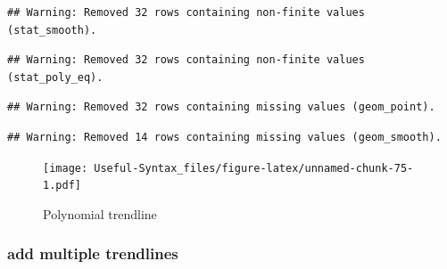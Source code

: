 \documentclass[
]{article}
\begin{document}
\begin{verbatim}
## Warning: Removed 32 rows containing non-finite values (stat_smooth).
\end{verbatim}

\begin{verbatim}
## Warning: Removed 32 rows containing non-finite values (stat_poly_eq).
\end{verbatim}

\begin{verbatim}
## Warning: Removed 32 rows containing missing values (geom_point).
\end{verbatim}

\begin{verbatim}
## Warning: Removed 14 rows containing missing values (geom_smooth).
\end{verbatim}

\begin{figure}
\centering
\texttt{[image: Useful-Syntax\_files/figure-latex/unnamed-chunk-75-1.pdf]}
\caption{\label{fig:unnamed-chunk-75}Polynomial trendline}
\end{figure}

\hypertarget{add-multiple-trendlines}{%
\subsubsection{add multiple trendlines}\label{add-multiple-trendlines}}
\end{document}
